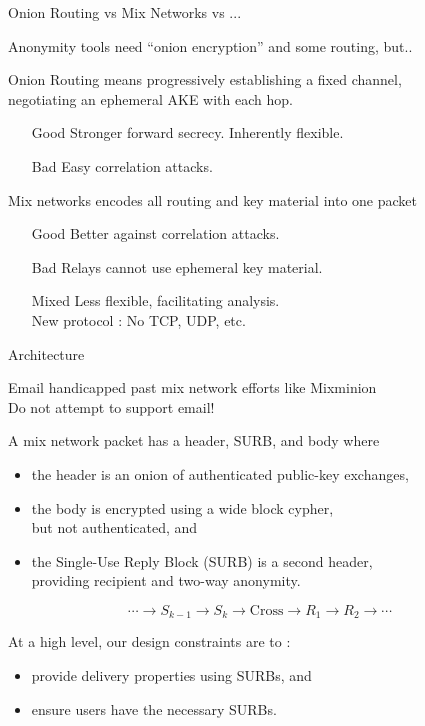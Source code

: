 \documentclass[fleqn,xcolor={usenames,dvipsnames}]{beamer}
\begin{document}
\begin{frame}[t]{Onion Routing vs Mix Networks vs ...}

Anonymity tools need ``onion encryption'' and some routing, but..

\bigskip

Onion Routing means progressively establishing a fixed channel, \\
\hspace*{2pt} negotiating an ephemeral AKE with each hop. \\
\begin{itemize}
\item[Good] Stronger forward secrecy.  Inherently flexible.
\item[Bad] Easy correlation attacks.
\end{itemize}

\medskip

Mix networks encodes all routing and key material into one packet
\begin{itemize}
\item[Good] Better against correlation attacks.
\item[Bad] Relays cannot use ephemeral key material. 
\item[Mixed] Less flexible, facilitating analysis. \\
  New protocol :  No TCP, UDP, etc.
\end{itemize}

\end{frame}


\begin{frame}{Architecture}

Email handicapped past mix network efforts like Mixminion \\
 \hspace*{10pt} Do not attempt to support email!
\medskip

A mix network packet has a header, SURB, and body where
\begin{itemize}
\item the header is an onion of authenticated public-key exchanges,
\item the body is encrypted using a wide block cypher, \\
  but not authenticated, and
\item the Single-Use Reply Block (SURB) is a second header, \\
 \hspace*{2pt} providing recipient and two-way anonymity.
\end{itemize}
\[ \cdots \to S_{k-1} \to S_k \to \textrm{Cross} \to R_1 \to R_2 \to \cdots \]

\medskip
\pause

At a high level, our design constraints are to : 
\begin{itemize}
\item provide delivery properties using SURBs, and 
\item ensure users have the necessary SURBs.
\end{itemize}

\end{frame}
\end{document}
